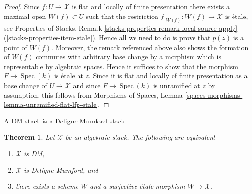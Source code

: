 \documentclass{stacks-project}
\theoremstyle{plain}
\newtheorem{theorem}[subsection]{Theorem}
\theoremstyle{definition}
\theoremstyle{remark}
\numberwithin{equation}{subsection}
\def\Spec{\mathop{\mathrm{Spec}}}
\begin{document}
\begin{proof}
Since $f : U \to \mathcal{X}$ is flat and locally of finite presentation
there exists a maximal open $W(f) \subset U$ such that the restriction
$f|_{W(f)} : W(f) \to \mathcal{X}$ is \'etale, see
Properties of Stacks, Remark
\ref{stacks-properties-remark-local-source-apply}
(\ref{stacks-properties-item-etale}).
Hence all we need to do is prove that $p(z)$ is a point of $W(f)$.
Moreover, the remark referenced above also shows the formation of $W(f)$
commutes with arbitrary base change by a morphism which is representable
by algebraic spaces. Hence it suffices to show that the morphism
$F \to \Spec(k)$ is \'etale at $z$. Since it is flat and locally
of finite presentation as a base change of $U \to \mathcal{X}$ and since
$F \to \Spec(k)$ is unramified at $z$ by assumption, this follows
from
Morphisms of Spaces,
Lemma \ref{spaces-morphisms-lemma-unramified-flat-lfp-etale}.
\end{proof}

\noindent
A DM stack is a Deligne-Mumford stack.

\begin{theorem}
\label{theorem-DM}
Let $\mathcal{X}$ be an algebraic stack. The following are equivalent
\begin{enumerate}
\item $\mathcal{X}$ is DM,
\item $\mathcal{X}$ is Deligne-Mumford, and
\item there exists a scheme $W$ and a surjective \'etale
morphism $W \to \mathcal{X}$.
\end{enumerate}
\end{theorem}
\end{document}
